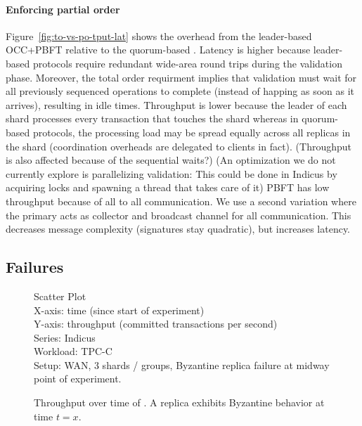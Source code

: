 \paragraph{Enforcing partial order} Figure~\ref{fig:to-vs-po-tput-lat} shows the overhead from the leader-based
OCC+PBFT relative to the quorum-based \sys{}. Latency is higher because leader-based
protocols require redundant wide-area round trips during the validation phase. Moreover, the total order requirment implies that validation must wait for all previously sequenced operations to complete (instead of happing as soon as it arrives), resulting in idle times.
Throughput is lower because the leader of each shard processes every transaction
that touches the shard whereas in quorum-based protocols, the processing load 
may be spread equally across all replicas in the shard (coordination overheads are delegated to clients in fact). (Throughput is also affected because of the sequential waits?)
(An optimization we do not currently explore is parallelizing validation: This could be done in Indicus by acquiring locks and spawning a thread that takes care of it)
PBFT has low throughput because of all to all communication. We use a second variation where the primary acts as collector and broadcast channel for all communication. This decreases message complexity (signatures stay quadratic), but increases latency.

\subsection{Failures}
\begin{figure}
  Scatter Plot\\
  X-axis: time (since start of experiment)\\
  Y-axis: throughput (committed transactions per second)\\
  Series: Indicus\\
  Workload: TPC-C\\
  Setup: WAN, 3 shards / groups, Byzantine replica failure at midway point of
  experiment.\\
  \caption{Throughput over time of \sys{}. A replica exhibits Byzantine
  behavior at time $t=x$.}
  \label{fig:failure-replica-tot}
\end{figure}

